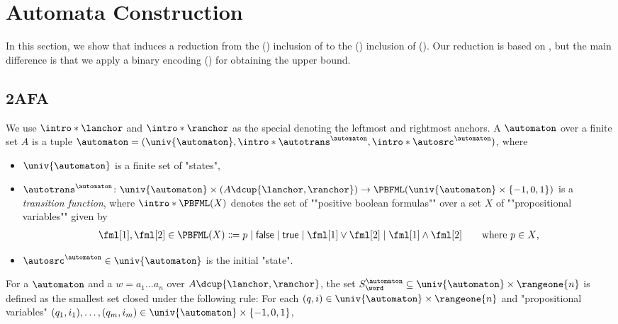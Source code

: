 \documentclass[a4paper,UKenglish,cleveref, autoref, thm-restate]{lipics-v2021}
\DeclarePairedDelimiter\set{\{}{\}}
\DeclarePairedDelimiter\tuple{(}{)}
\newcommand{\const}[1]{\mathsf{#1}}
\begin{document}
\section{Automata Construction} \label{section: automata construction}
In this section, 
we show that 
induces a reduction
from the () inclusion of 
to the () inclusion of  ().
Our reduction is based on \cite[\S 5.3]{nakamuraDerivativesGraphsPositive2025},
but the main difference is that we apply a binary encoding () for obtaining the  upper bound.

%
%

\subsection{2AFA}
\AP
We use $\intro*\lanchor$ and $\intro*\ranchor$ as the special  denoting the leftmost and rightmost anchors.
%
A \intro*{} $\automaton$ over a finite set $A$ is a tuple $\automaton = \tuple{\univ{\automaton}, \intro*\autotrans^{\automaton}, \intro*\autosrc^{\automaton}}$, where 
\begin{itemize}
    \item $\univ{\automaton}$ is a finite set of "states",
    \item \AP $\autotrans^{\automaton} \colon \univ{\automaton} \times (A \dcup \set{\lanchor, \ranchor}) \to \PBFML(\univ{\automaton} \times \set{-1, 0, 1})$ is a \emph{transition function},
    where $\intro*\PBFML(X)$ denotes the set of ""positive boolean formulas"" over a set $X$ of ""propositional variables"" given by
    \begin{align*}
        \fml[1], \fml[2] \in \PBFML(X) \Coloneqq p \mid \const{false} \mid \const{true} \mid \fml[1] \lor \fml[2] \mid \fml[1] \land \fml[2] \tag*{where $p \in X$,}
    \end{align*}
\item $\autosrc^{\automaton} \in \univ{\automaton}$ is the initial "state".
\end{itemize}
For a  $\automaton$ and a  $w = a_{1} \dots a_{n}$ over $A \dcup \set{\lanchor, \ranchor}$,
the set $S^{\automaton}_{\word} \subseteq \univ{\automaton} \times \rangeone{n}$ is defined as
the smallest set closed under the following rule:
    For each $\tuple{q, i} \in \univ{\automaton} \times \rangeone{n}$
    and "propositional variables" $\tuple{q_1, i_1}, \dots, \tuple{q_{m}, i_{m}} \in \univ{\automaton} \times \set{-1, 0, 1}$,
\end{document}
